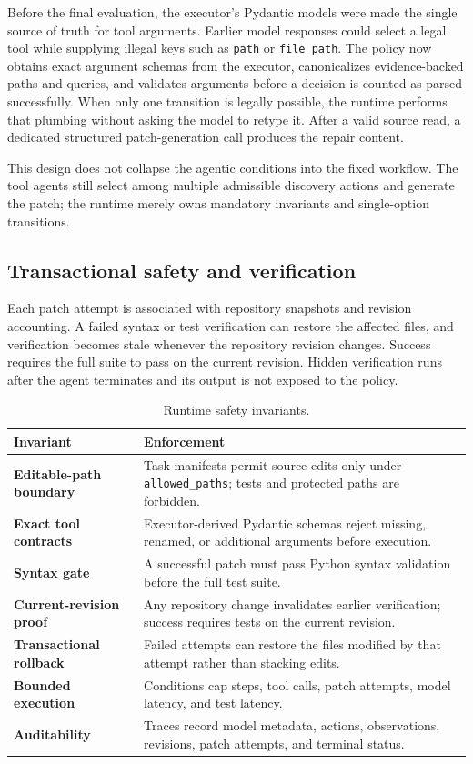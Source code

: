 \documentclass[11pt,a4paper]{article}
\newcommand{\code}[1]{\texttt{#1}}
\begin{document}
Before the final evaluation, the executor's Pydantic models were made the
single source of truth for tool arguments. Earlier
model responses could select a legal tool while supplying illegal keys such as
\code{path} or \code{file\_path}. The policy now obtains exact argument
schemas from the executor, canonicalizes evidence-backed paths and queries, and
validates arguments before a decision is counted as parsed successfully. When
only one transition is legally possible, the runtime performs that plumbing
without asking the model to retype it. After a valid source read, a dedicated
structured patch-generation call produces the repair content.

This design does not collapse the agentic conditions into the fixed workflow.
The tool agents still select among multiple admissible discovery actions and
generate the patch; the runtime merely owns mandatory invariants and
single-option transitions.

\subsection{Transactional safety and verification}

Each patch attempt is associated with repository snapshots and revision
accounting. A failed syntax or test verification can restore the affected files,
and verification becomes stale whenever the repository revision changes.
Success requires the full suite to pass on the current revision. Hidden
verification runs after the agent terminates and its output is not exposed to the
policy.

\begin{table}[H]
\centering
\caption{Runtime safety invariants.}
\begin{tabularx}{\textwidth}{>{\bfseries}p{}X}
\toprule
Invariant & Enforcement \\
\midrule
Editable-path boundary & Task manifests permit source edits only under
\code{allowed\_paths}; tests and protected paths are forbidden. \\
Exact tool contracts & Executor-derived Pydantic schemas reject missing,
renamed, or additional arguments before execution. \\
Syntax gate & A successful patch must pass Python syntax validation before the
full test suite. \\
Current-revision proof & Any repository change invalidates earlier verification;
success requires tests on the current revision. \\
Transactional rollback & Failed attempts can restore the files modified by that
attempt rather than stacking edits. \\
Bounded execution & Conditions cap steps, tool calls, patch attempts, model
latency, and test latency. \\
Auditability & Traces record model metadata, actions, observations, revisions,
patch attempts, and terminal status. \\
\bottomrule
\end{tabularx}
\end{table}
\end{document}
